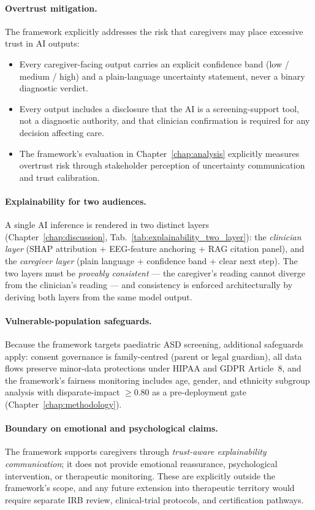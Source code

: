 \paragraph{Overtrust mitigation.} The framework explicitly addresses the risk that caregivers may place excessive trust in AI outputs:
\begin{itemize}[leftmargin=*, itemsep=3pt]
    \item Every caregiver-facing output carries an explicit confidence band (low / medium / high) and a plain-language uncertainty statement, never a binary diagnostic verdict.
    \item Every output includes a disclosure that the AI is a screening-support tool, not a diagnostic authority, and that clinician confirmation is required for any decision affecting care.
    \item The framework's evaluation in Chapter~\ref{chap:analysis} explicitly measures overtrust risk through stakeholder perception of uncertainty communication and trust calibration.
\end{itemize}

\paragraph{Explainability for two audiences.} A single AI inference is rendered in two distinct layers (Chapter~\ref{chap:discussion}, Tab.~\ref{tab:explainability_two_layer}): the \emph{clinician layer} (SHAP attribution + EEG-feature anchoring + RAG citation panel), and the \emph{caregiver layer} (plain language + confidence band + clear next step). The two layers must be \emph{provably consistent} --- the caregiver's reading cannot diverge from the clinician's reading --- and consistency is enforced architecturally by deriving both layers from the same model output.

\paragraph{Vulnerable-population safeguards.} Because the framework targets paediatric ASD screening, additional safeguards apply: consent governance is family-centred (parent or legal guardian), all data flows preserve minor-data protections under HIPAA and GDPR Article~8, and the framework's fairness monitoring includes age, gender, and ethnicity subgroup analysis with disparate-impact $\geq 0.80$ as a pre-deployment gate (Chapter~\ref{chap:methodology}).

\paragraph{Boundary on emotional and psychological claims.} The framework supports caregivers through \emph{trust-aware explainability communication}; it does not provide emotional reassurance, psychological intervention, or therapeutic monitoring. These are explicitly outside the framework's scope, and any future extension into therapeutic territory would require separate IRB review, clinical-trial protocols, and certification pathways.

